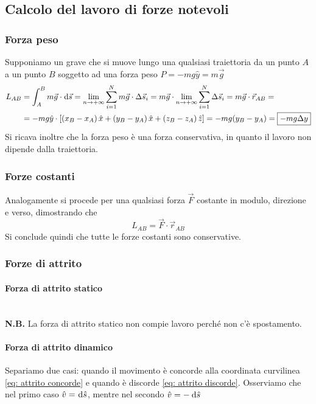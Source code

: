 \documentclass{article}
\theoremstyle{plain}
\begin{document}
\subsection{Calcolo del lavoro di forze notevoli}
\subsubsection{Forza peso}
Supponiamo un grave che si muove lungo una qualsiasi traiettoria da un punto $A$ a un punto $B$ soggetto ad una forza peso $P=-mg\hat y=m\vec g$
\[\begin{aligned}
    L_{AB}&=\int_A^B m\vec g \cdot \!\:\text{d} \vec s=\lim_{n\to +\infty}\sum_{i=1}^Nm\vec g\cdot \Delta \vec s_i=m\vec g\cdot \lim_{n\to +\infty}\sum_{i=1}^N\Delta \vec s_i=m\vec g\cdot \vec r_{AB}=\\&=-mg \hat y \cdot \left[ \left( x_B-x_A \right)\hat x+ \left( y_B-y_A \right)\hat x+ \left( z_B-z_A \right)\hat z \right]=-mg (y_B-y_A)=\boxed{-mg\Delta y}
\end{aligned}\]
Si ricava inoltre che la forza peso è una forza conservativa, in quanto il lavoro non dipende dalla traiettoria.
\subsubsection{Forze costanti}
Analogamente si procede per una qualsiasi forza $\vec F$ costante in modulo, direzione e verso, dimostrando che 
\[L_{AB}=\vec F \cdot \vec r_{AB}\]
Si conclude quindi che tutte le forze costanti sono conservative. 

\subsubsection{Forze di attrito}    
\paragraph{Forza di attrito statico}~\\
\textbf{N.B.} La forza di attrito statico non compie lavoro perché non c'è spostamento.
\paragraph{Forza di attrito dinamico}
Separiamo due casi: quando il movimento è concorde alla coordinata curvilinea \eqref{eq: attrito concorde} e quando è discorde 
\eqref{eq: attrito discorde}. Osserviamo che nel primo caso $\hat v =\! \:\text{d} \hat s$, mentre nel secondo $\hat v = -\:\text{d} \hat s$
\end{document}
